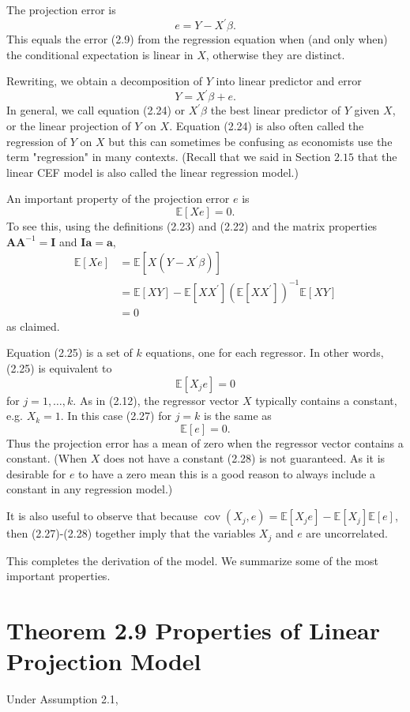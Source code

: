 \documentclass[10pt]{article}
\begin{document}
The projection error is
$$
e=Y-X^{\prime} \beta .
$$
This equals the error (2.9) from the regression equation when (and only when) the conditional expectation is linear in $X$, otherwise they are distinct.

Rewriting, we obtain a decomposition of $Y$ into linear predictor and error
$$
Y=X^{\prime} \beta+e .
$$
In general, we call equation (2.24) or $X^{\prime} \beta$ the best linear predictor of $Y$ given $X$, or the linear projection of $Y$ on $X$. Equation (2.24) is also often called the regression of $Y$ on $X$ but this can sometimes be confusing as economists use the term "regression" in many contexts. (Recall that we said in Section $2.15$ that the linear CEF model is also called the linear regression model.)

An important property of the projection error $e$ is
$$
\mathbb{E}[X e]=0 .
$$
To see this, using the definitions (2.23) and (2.22) and the matrix properties $\boldsymbol{A} \boldsymbol{A}^{-1}=\boldsymbol{I}$ and $\boldsymbol{I} \boldsymbol{a}=\boldsymbol{a}$,
$$
\begin{aligned}
\mathbb{E}[X e] &=\mathbb{E}\left[X\left(Y-X^{\prime} \beta\right)\right] \\
&=\mathbb{E}[X Y]-\mathbb{E}\left[X X^{\prime}\right]\left(\mathbb{E}\left[X X^{\prime}\right]\right)^{-1} \mathbb{E}[X Y] \\
&=0
\end{aligned}
$$
as claimed.

Equation (2.25) is a set of $k$ equations, one for each regressor. In other words, (2.25) is equivalent to
$$
\mathbb{E}\left[X_{j} e\right]=0
$$
for $j=1, \ldots, k$. As in (2.12), the regressor vector $X$ typically contains a constant, e.g. $X_{k}=1$. In this case (2.27) for $j=k$ is the same as
$$
\mathbb{E}[e]=0 .
$$
Thus the projection error has a mean of zero when the regressor vector contains a constant. (When $X$ does not have a constant (2.28) is not guaranteed. As it is desirable for $e$ to have a zero mean this is a good reason to always include a constant in any regression model.)

It is also useful to observe that because $\operatorname{cov}\left(X_{j}, e\right)=\mathbb{E}\left[X_{j} e\right]-\mathbb{E}\left[X_{j}\right] \mathbb{E}[e]$, then (2.27)-(2.28) together imply that the variables $X_{j}$ and $e$ are uncorrelated.

This completes the derivation of the model. We summarize some of the most important properties.

\section{Theorem 2.9 Properties of Linear Projection Model}
Under Assumption 2.1,
\end{document}
